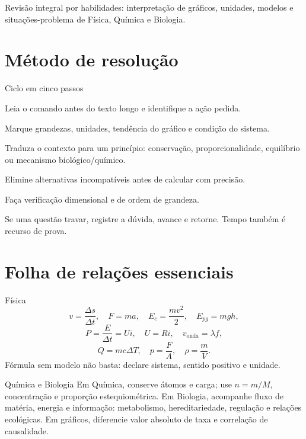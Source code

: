 \documentclass{notaaula}
\begin{document}
        \cabecalho

        \begin{sobre}
        Revisão integral por habilidades: interpretação de gráficos, unidades, modelos e situações-problema de Física, Química e Biologia.
        \end{sobre}

        \section{Método de resolução}

\begin{copiar}{Ciclo em cinco passos}
\begin{itens}
\item Leia o comando antes do texto longo e identifique a ação pedida.
\item Marque grandezas, unidades, tendência do gráfico e condição do sistema.
\item Traduza o contexto para um princípio: conservação, proporcionalidade, equilíbrio ou mecanismo biológico/químico.
\item Elimine alternativas incompatíveis antes de calcular com precisão.
\item Faça verificação dimensional e de ordem de grandeza.
\end{itens}
Se uma questão travar, registre a dúvida, avance e retorne. Tempo também é recurso de prova.
\end{copiar}

\section{Folha de relações essenciais}

\begin{copiar}{Física}
\[
  v=\frac{\Delta s}{\Delta t},\quad
  F=ma,\quad
  E_c=\frac{mv^2}{2},\quad
  E_{pg}=mgh,
\]
\[
  P=\frac{E}{\Delta t}=Ui,\quad
  U=Ri,\quad
  v_{\mathrm{onda}}=\lambda f,
\]
\[
  Q=mc\Delta T,\quad
  p=\frac{F}{A},\quad
  \rho=\frac{m}{V}.
\]
Fórmula sem modelo não basta: declare sistema, sentido positivo e unidade.
\end{copiar}

\begin{copiar}{Química e Biologia}
Em Química, conserve átomos e carga; use $n=m/M$, concentração e proporção estequiométrica.
Em Biologia, acompanhe fluxo de matéria, energia e informação: metabolismo, hereditariedade,
regulação e relações ecológicas. Em gráficos, diferencie valor absoluto de taxa e correlação de causalidade.
\end{copiar}
\end{document}
